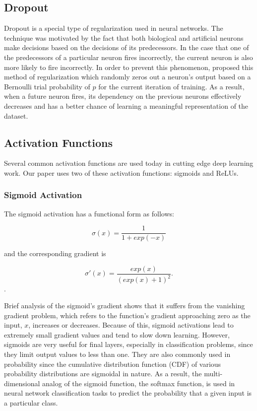 \subsection{Dropout}
Dropout is a special type of regularization used in neural networks. The technique was motivated by the fact that both biological and artificial neurons make decisions based on the decisions of its predecessors. In the case that one of the predecessors of a particular neuron fires incorrectly, the current neuron is also more likely to fire incorrectly. In order to prevent this phenomenon, \citet{dropout} proposed this method of regularization which randomly zeros out a neuron's output based on a Bernoulli trial probability of $p$ for the current iteration of training. As a result, when a future neuron fires, its dependency on the previous neurons effectively decreases and has a better chance of learning a meaningful representation of the dataset. 


\subsection{Activation Functions}
\label{activationfunctions}

Several common activation functions are used today in cutting edge deep learning work. Our paper uses two of these activation functions: sigmoids and ReLUs. 
\subsubsection*{Sigmoid Activation}

The sigmoid activation has a functional form as follows: 

\begin{equation}
	\sigma(x) = \frac{1}{1 + exp(-x)}
\end{equation}

\noindent
and the corresponding gradient is 

\begin{equation}
	\sigma ' (x)  = \frac{exp(x)}{(exp(x) + 1)^2}.
\end{equation}. 

Brief analysis of the sigmoid's gradient shows that it suffers from the vanishing gradient problem, which refers to the function's gradient approaching zero as the input, $x$, increases or decreases. Because of this, sigmoid activations lead to extremely small gradient values and tend to slow down learning. However, sigmoids are very useful for final layers, especially in classification problems, since they limit output values to less than one. They are also commonly used in probability since the cumulative distribution function (CDF) of various probability distributions are sigmoidal in nature. As a result, the multi-dimensional analog of the sigmoid function, the softmax function, is used in neural network classification tasks to predict the probability that a given input is a particular class. 

